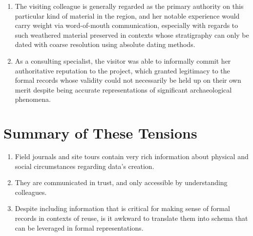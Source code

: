 \documentclass[12pt]{article}
\begin{document}
\begin{enumerate}
  \item The visiting colleague is generally regarded as the primary authority on this particular kind of material in the region, and her notable experience would carry weight via word-of-mouth communication, especially with regards to such weathered material preserved in contexts whose stratigraphy can only be dated with coarse resolution using absolute dating methods.
  \item As a consulting specialist, the visitor was able to informally commit her authoritative reputation to the project, which granted legitimacy to the formal records whose validity could not necessarily be held up on their own merit despite being accurate representations of significant archaeological phenomena.
\end{enumerate}

\section{Summary of These Tensions}
\begin{enumerate}
  \item Field journals and site tours contain very rich information about physical and social circumstances regarding data’s creation.
  \item They are communicated in trust, and only accessible by understanding colleagues.
  \item Despite including information that is critical for making sense of formal records in contexts of reuse, is it awkward to translate them into schema that can be leveraged in formal representations.
\end{enumerate}
\end{document}
